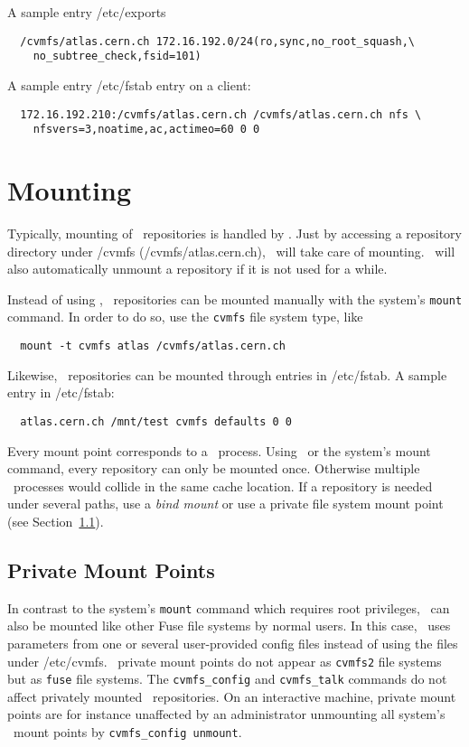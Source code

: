 A sample entry /etc/exports
\begin{verbatim}
  /cvmfs/atlas.cern.ch 172.16.192.0/24(ro,sync,no_root_squash,\
    no_subtree_check,fsid=101)
\end{verbatim}
A sample entry /etc/fstab entry on a client:
\begin{verbatim}
  172.16.192.210:/cvmfs/atlas.cern.ch /cvmfs/atlas.cern.ch nfs \
    nfsvers=3,noatime,ac,actimeo=60 0 0
\end{verbatim}


\section{Mounting}
Typically, mounting of \cvmfs\ repositories is handled by \autofs.
Just by accessing a repository directory under /cvmfs (\eg /cvmfs/atlas.cern.ch), \autofs\ will take care of mounting.
\autofs\ will also automatically unmount a repository if it is not used for a while.

Instead of using \autofs, \cvmfs\ repositories can be mounted manually with the system's \texttt{mount} command.
In order to do so, use the \texttt{cvmfs} file system type, like
\begin{verbatim}
  mount -t cvmfs atlas /cvmfs/atlas.cern.ch
\end{verbatim}
Likewise, \cvmfs\ repositories can be mounted through entries in /etc/fstab.
A sample entry in /etc/fstab:
\begin{verbatim}
  atlas.cern.ch /mnt/test cvmfs defaults 0 0
\end{verbatim}

Every mount point corresponds to a \cvmfs\ process.
Using \autofs\ or the system's mount command, every repository can only be mounted once.
Otherwise multiple \cvmfs\ processes would collide in the same cache location.
If a repository is needed under several paths, use a \emph{bind mount} or use a private file system mount point (see Section~\ref{sct:privatemount}).

\subsection{Private Mount Points}
\label{sct:privatemount}
In contrast to the system's \texttt{mount} command which requires root privileges, \cvmfs\ can also be mounted like other Fuse file systems by normal users.
In this case, \cvmfs\ uses parameters from one or several user-provided config files instead of using the files under /etc/cvmfs.
\cvmfs\ private mount points do not appear as \texttt{cvmfs2} file systems but as \texttt{fuse} file systems.
The \texttt{cvmfs\_config} and \texttt{cvmfs\_talk} commands do not affect privately mounted \cvmfs\ repositories.
On an interactive machine, private mount points are for instance unaffected by an administrator unmounting all system's \cvmfs\ mount points by \texttt{cvmfs\_config unmount}.

